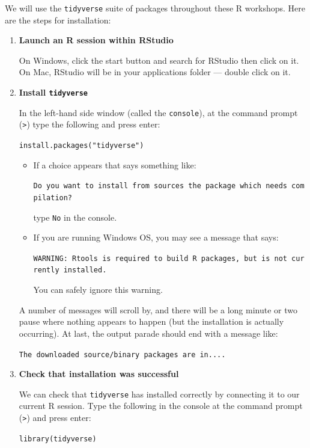 \documentclass[
]{book}
\begin{document}
We will use the \texttt{tidyverse} suite of packages throughout these R workshops.
Here are the steps for installation:

\begin{enumerate}
\def\labelenumi{\arabic{enumi}.}
\item
  \textbf{Launch an R session within RStudio}

  On Windows, click the start button and search for RStudio then click on it. On Mac,
  RStudio will be in your applications folder --- double click on it.
\item
  \textbf{Install \texttt{tidyverse}}

  In the left-hand side window (called the \texttt{console}), at the command prompt (\texttt{\textgreater{}}) type the following and press enter:

  \texttt{install.packages("tidyverse")}

  \begin{itemize}
  \item
    If a choice appears that says something like:

    \texttt{Do\ you\ want\ to\ install\ from\ sources\ the\ package\ which\ needs\ compilation?}

    type \texttt{No} in the console.
  \item
    If you are running Windows OS, you may see a message that says:

    \texttt{WARNING:\ Rtools\ is\ required\ to\ build\ R\ packages,\ but\ is\ not\ currently\ installed.}

    You can safely ignore this warning.
  \end{itemize}

  A number of messages will scroll by, and there will be a long minute or two
  pause where nothing appears to happen (but the installation is actually occurring).
  At last, the output parade should end with a message like:

  \texttt{The\ downloaded\ source/binary\ packages\ are\ in....}
\item
  \textbf{Check that installation was successful}

  We can check that \texttt{tidyverse} has installed correctly by connecting it to our current R session.
  Type the following in the console at the command prompt (\texttt{\textgreater{}}) and press enter:

  \texttt{library(tidyverse)}

  \begin{alert}


\end{alert}
\end{enumerate}
\end{document}
